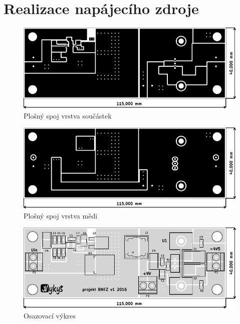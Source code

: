 \clearpage
\section{Realizace napájecího zdroje}


\begin{figure}[H]
	\centering 	
	\includegraphics[width=17cm]{../design/PDF_out/top.pdf}
	\caption{Plošný spoj vrstva součástek}	
\end{figure}

\begin{figure}[H]
	\centering 	
	\includegraphics[width=17cm]{../design/PDF_out/bot.pdf}
	\caption{Plošný spoj vrstva mědi}	
\end{figure}

\begin{figure}[H]
	\centering 	
	\includegraphics[width=17cm]{../design/PDF_out/osazovak.pdf}
	\caption{Osazovací výkres}	
\end{figure}




